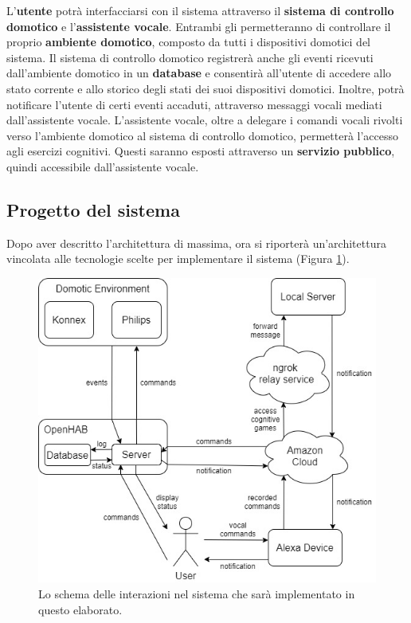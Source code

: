 L’\textbf{utente} potrà interfacciarsi con il sistema attraverso il
\textbf{sistema di controllo domotico} e l’\textbf{assistente vocale}. Entrambi
gli permetteranno di controllare il proprio \textbf{ambiente domotico},
composto da tutti i dispositivi domotici del sistema. Il sistema di controllo
domotico registrerà anche gli eventi ricevuti dall’ambiente domotico in un
\textbf{database} e consentirà all’utente di accedere allo stato corrente e
allo storico degli stati dei suoi dispositivi domotici. Inoltre, potrà
notificare l’utente di certi eventi accaduti, attraverso messaggi vocali
mediati dall’assistente vocale. L’assistente vocale, oltre a delegare i comandi
vocali rivolti verso l’ambiente domotico al sistema di controllo domotico,
permetterà l’accesso agli esercizi cognitivi. Questi saranno esposti attraverso
un \textbf{servizio pubblico}, quindi accessibile dall’assistente vocale.

\subsection{Progetto del sistema}
\label{subsec:Sezione3.1.2}

Dopo aver descritto l’architettura di massima, ora si riporterà un’architettura
vincolata alle tecnologie scelte per implementare il sistema (Figura
\ref{fig:figure3.2}).

\begin{figure}[!ht]
  \centering
  \includegraphics[scale=0.6]{resources/images/design/system-structure-design-diagram.jpg}
  \caption{
    Lo schema delle interazioni nel sistema che sarà implementato in questo
    elaborato.
  }
  \label{fig:figure3.2}
\end{figure}

